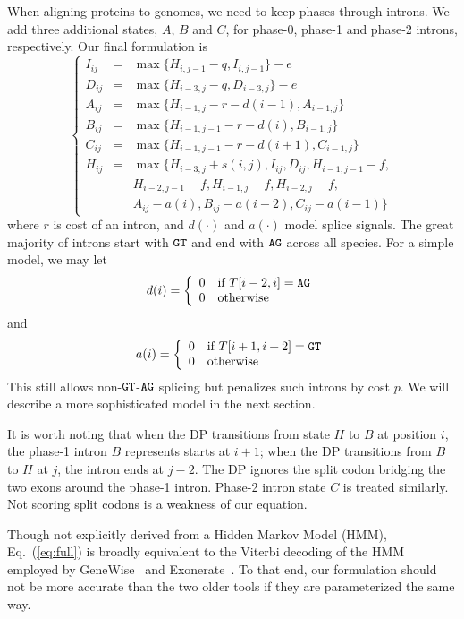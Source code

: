 \documentclass{bioinfo}
\begin{document}
\begin{methods}
When aligning proteins to genomes, we need to keep phases through introns. We
add three additional states, $A$, $B$ and $C$, for phase-0, phase-1 and phase-2
introns, respectively.  Our final formulation is
\begin{equation}\label{eq:full}
\left\{\begin{array}{lll}
I_{ij}&=&\max\{ H_{i,j-1} - q, I_{i,j-1} \} - e \\
D_{ij}&=&\max\{ H_{i-3,j} - q, D_{i-3,j} \} - e \\
A_{ij}&=&\max\{ H_{i-1,j} - r - d(i-1), A_{i-1,j} \} \\
B_{ij}&=&\max\{ H_{i-1,j-1} - r - d(i), B_{i-1,j} \} \\
C_{ij}&=&\max\{ H_{i-1,j-1} - r - d(i+1), C_{i-1,j} \} \\
H_{ij}&=&\max\{ H_{i-3,j}+s(i,j), I_{ij}, D_{ij}, H_{i-1,j-1}-f, \\
       && H_{i-2,j-1}-f, H_{i-1,j}-f, H_{i-2,j}-f, \\
	   && A_{ij}-a(i), B_{ij}-a(i-2), C_{ij}-a(i-1) \}
\end{array}\right.
\end{equation}
where $r$ is cost of an intron, and $d(\cdot)$ and $a(\cdot)$ model splice
signals. The great majority of introns start with ${\tt GT}$ and end with ${\tt
AG}$ across all species. For a simple model, we may let
$$
d(i)=\left\{\begin{array}{ll}
0 & \mbox{if $T[i-2,i]={\tt AG}$}\\
0 & \mbox{otherwise}\\
\end{array}\right.
$$
and
$$
a(i)=\left\{\begin{array}{ll}
0 & \mbox{if $T[i+1,i+2]={\tt GT}$}\\
0 & \mbox{otherwise}\\
\end{array}\right.
$$
This still allows non-${\tt GT}$-${\tt AG}$ splicing but penalizes such introns
by cost $p$. We will describe a more sophisticated model in the next section.

It is worth noting that when the DP transitions from state $H$ to $B$ at
position $i$, the phase-1 intron $B$ represents starts at $i+1$; when the DP
transitions from $B$ to $H$ at $j$, the intron ends at $j-2$. The DP ignores
the split codon bridging the two exons around the phase-1 intron. Phase-2
intron state $C$ is treated similarly. Not scoring split codons is a weakness
of our equation.

Though not explicitly derived from a Hidden Markov Model (HMM),
Eq.~(\ref{eq:full}) is broadly equivalent to the Viterbi decoding of the HMM
employed by GeneWise~\citep{Birney:2004uy} and Exonerate~\citep{Slater:2005aa}.
To that end, our formulation should not be more accurate than the two older
tools if they are parameterized the same way.


\end{methods}
\end{document}
